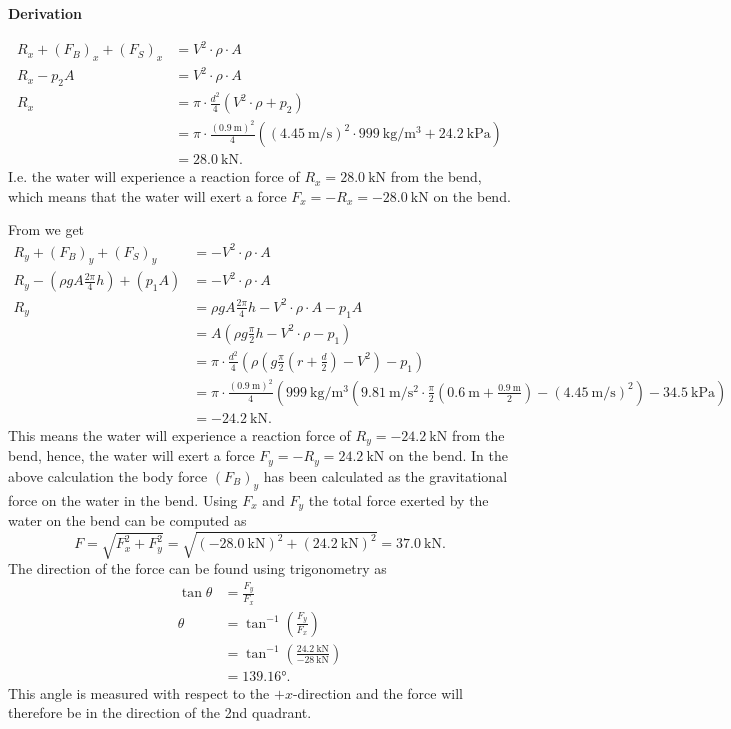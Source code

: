 \documentclass[a4paper]{article}
\numberwithin{equation}{problem}
\newcommand{\AUheading}[1]{%
  \par\vspace{.4\baselineskip}%
  {\sffamily\bfseries\color{AUblueDark}#1\par}%
  \nobreak%
}
\newenvironment{derivation}[1][Derivation]{%
  \AUheading{#1}
  \begingroup\allowdisplaybreaks
  \setlength{\abovedisplayskip}{6pt}%
  \setlength{\belowdisplayskip}{6pt}%
  \setlength{\abovedisplayshortskip}{4pt}%
  \setlength{\belowdisplayshortskip}{4pt}%
}{\par\endgroup\medskip}
\begin{document}
\begin{derivation}
\begin{align*}
  R_x + \left( F_B \right)_x + \left( F_S \right)_x &= V^2 \cdot \rho \cdot A \\
  R_x - p_2 A &= V^2 \cdot \rho \cdot A \\
  R_x &= \pi \cdot \frac{d^2}{4} \left( V^2 \cdot \rho + p_2 \right) \\
      &= \pi \cdot \frac{\left( \qty{0,9}{\meter}  \right)^2}{4} \left( \left( \qty{4,45}{\meter\per\second}  \right)^2 \cdot \qty{999}{\kilogram\per\cubic\meter} + \qty{24,2}{\kilo\pascal} \right) \\
  &= \qty{28,0}{\kilo\newton}
.\end{align*}
I.e. the water will experience a reaction force of $R_x = \qty{28,0}{\kilo\newton}$ from the bend, which means that the water will exert a force $F_x = - R_x = \qty{-28,0}{\kilo\newton}$ on the bend.

From  we get
\begin{align*}
  R_y + \left( F_B \right)_y + \left( F_S \right)_y &= - V^2 \cdot \rho \cdot A \\
  R_y - \left( \rho g A \frac{2\pi}{4} h \right) + \left( p_1 A \right) &= - V^2 \cdot \rho\cdot A \\
  R_y &= \rho g A \frac{2\pi}{4}h - V^2 \cdot \rho \cdot A - p_1 A \\
      &= A \left( \rho g \frac{\pi}{2}h - V^2 \cdot \rho - p_1 \right) \\
      &= \pi \cdot \frac{d^2}{4} \left( \rho \left( g \frac{\pi}{2} \left( r + \frac{d}{2} \right) - V^2 \right) - p_1 \right) \\
      &= \pi \cdot \frac{\left( \qty{0,9}{\meter} \right)^2}{4} \left( \qty{999}{\kg\per\cubic\m} \left( \qty{9,81}{\m\per\square\s} \cdot \frac{\pi}{2} \left( \qty{0,6}{\m} + \frac{\qty{0,9}{\m} }{2} \right) - \left( \qty{4,45}{\meter\per\s}  \right)^2  \right) - \qty{34,5}{\kilo\Pa}  \right) \\
      &= \qty{-24,2}{\kilo\newton}
.\end{align*}
This means the water will experience a reaction force of $R_y = \qty{-24,2}{\kilo\newton}$ from the bend, hence, the water will exert a force $F_y = - R_y = \qty{24,2}{\kilo\newton}$ on the bend.
In the above calculation the body force $\left( F_B \right)_y$ has been calculated as the gravitational force on the water in the bend.
Using $F_x$ and $F_y$ the total force exerted by the water on the bend can be computed as
\[ 
F = \sqrt{F_x^2 + F_y^2} = \sqrt{\left( -\qty{28,0}{\kilo\newton}  \right)^2 + \left( \qty{24,2}{\kilo\newton}  \right)^2} = \qty{37,0}{\kilo\newton} 
.\]
The direction of the force can be found using trigonometry as
\begin{align*}
  \tan \theta &= \frac{F_y}{F_x} \\
  \theta &= \tan^{-1} \left( \frac{F_y}{F_x} \right)\\
  &= \tan^{-1} \left( \frac{\qty{24,2}{\kilo\newton} }{\qty{-28}{\kilo\newton} } \right) \\
  &= \ang{139,16}
.\end{align*}
This angle is measured with respect to the $+x$-direction and the force will therefore be in the direction of the 2nd quadrant.
\end{derivation}
\end{document}
